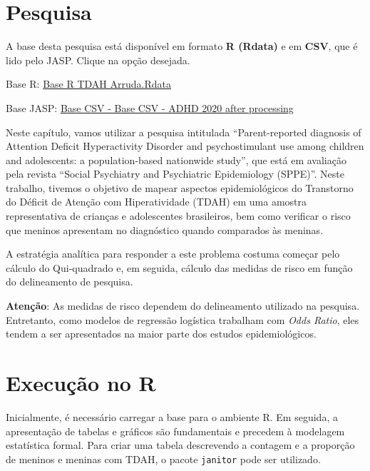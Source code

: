 \documentclass[
]{book}
\newenvironment{base}{
  \definecolor{shadecolor}{rgb}{0.972,0.972,0.972}  %
  \color{black}
  \begin{shaded}}
 {\end{shaded}}
\begin{document}
\hypertarget{pesquisa-2}{%
\section{Pesquisa}\label{pesquisa-2}}

\begin{base}
A base desta pesquisa está disponível em formato \textbf{R (Rdata)} e em \textbf{CSV}, que é lido pelo JASP. Clique na opção desejada.

Base R: \href{https://github.com/anovabr/mqt/raw/master/bases/Base\%20R\%20TDAH\%20Arruda.RData}{Base R TDAH Arruda.Rdata}

Base JASP: \href{https://github.com/anovabr/mqt/raw/master/bases/bases_csv_jasp.zip}{Base CSV - Base CSV - ADHD 2020 after processing}

\end{base}

Neste capítulo, vamos utilizar a pesquisa intitulada ``Parent-reported diagnosis of Attention Deficit Hyperactivity Disorder and psychostimulant use among children and adolescents: a population-based nationwide study'', que está em avaliação pela revista ``Social Psychiatry and Psychiatric Epidemiology (SPPE)''. Neste trabalho, tivemos o objetivo de mapear aspectos epidemiológicos do Transtorno do Déficit de Atenção com Hiperatividade (TDAH) em uma amostra representativa de crianças e adolescentes brasileiros, bem como verificar o risco que meninos apresentam no diagnóstico quando comparados às meninas.

A estratégia analítica para responder a este problema costuma começar pelo cálculo do Qui-quadrado e, em seguida, cálculo das medidas de risco em função do delineamento de pesquisa.

\textbf{Atenção}: As medidas de risco dependem do delineamento utilizado na pesquisa. Entretanto, como modelos de regressão logística trabalham com \emph{Odds Ratio}, eles tendem a ser apresentados na maior parte dos estudos epidemiológicos.

\hypertarget{execuuxe7uxe3o-no-r-2}{%
\section{Execução no R}\label{execuuxe7uxe3o-no-r-2}}

Inicialmente, é necessário carregar a base para o ambiente R. Em seguida, a apresentação de tabelas e gráficos são fundamentais e precedem à modelagem estatística formal. Para criar uma tabela descrevendo a contagem e a proporção de meninos e meninas com TDAH, o pacote \texttt{janitor} pode ser utilizado.
\end{document}
